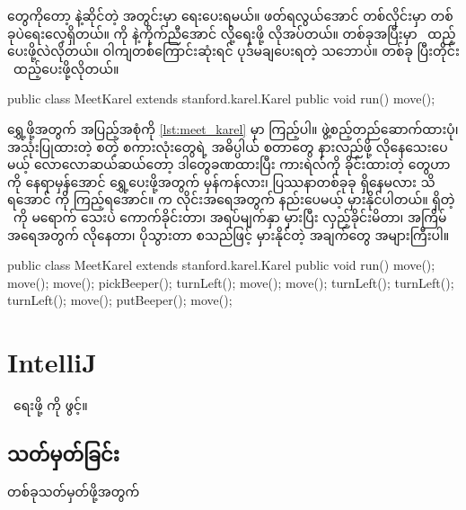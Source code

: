 \begin{sloppypar}
\mmcommand တွေကိုတော့  နဲ့ဆိုင်တဲ့ \mmcurlybrpair အတွင်းမှာ ရေးပေးရမယ်။ ဖတ်ရလွယ်အောင် တစ်လိုင်းမှာ တစ်ခုပဲရေးလေ့ရှိတယ်။  \mmcommand ကို \enJPL \mmsyntax နဲ့ကိုက်ညီအောင်  လို့ရေးဖို့ လိုအပ်တယ်။ \mmcommand တစ်ခုအပြီးမှာ \ensemicol\ ထည့်ပေးဖို့လဲလိုတယ်။ ဝါကျတစ်ကြောင်းဆုံးရင် ပုဒ်မချပေးရတဲ့ သဘောပဲ။ \mmcommand တစ်ခု ပြီးတိုင်း \mmsemicol\ ထည့်ပေးဖို့လိုတယ်။
\begin{lstcodeminimal}[]
public class MeetKarel extends stanford.karel.Karel { 
        public void run() {
                move();
        }        
}
\end{lstcodeminimal} 

\noindent \mmbeeper ရွှေ့ဖို့အတွက် \mmprogram အပြည့်အစုံကို \Lst \vref*{lst:meet_karel} မှာ ကြည့်ပါ။ \entemplate ဖွဲ့စည့်တည်ဆောက်ထားပုံ၊ အသုံးပြုထားတဲ့  စတဲ့ စကားလုံးတွေရဲ့ အဓိပ္ပါယ် စတာတွေ နားလည်ဖို့ လိုနေသေးပေမယ့် လောလောဆယ်ဆယ်တော့ ဒါတွေခဏထားပြီး ကားရဲလ်ကို ခိုင်းထားတဲ့ \mmcommand တွေဟာ \mmbeeper ကို နေရာမှန်အောင် ရွှေ့ပေးဖို့အတွက် မှန်ကန်လား၊ ပြဿနာတစ်ခုခု ရှိနေမလား သိရအောင် \mmprogram ကို \mmrun ကြည့်ရအောင်။ \mmprogram က လိုင်းအရေအတွက် နည်းပေမယ့် မှားနိုင်ပါတယ်။  \mmbeeper ရှိတဲ့ \mmcorner\ ကို မရောက် သေးပဲ ကောက်ခိုင်းတာ၊ အရပ်မျက်နှာ မှားပြီး လှည့်ခိုင်းမိတာ၊ အကြိမ်အရေအတွက် လိုနေတာ၊ ပိုသွားတာ စသည်ဖြင့် မှားနိုင်တဲ့ အချက်တွေ အများကြီးပါ။ 
\begin{lstcodesimple}[float, caption=ကားရဲလ် ပရိုဂရမ် template, label={lst:meet_karel}]
public class MeetKarel extends stanford.karel.Karel { 
        public void run() {
                move();
                move();
                move();
                pickBeeper();
                turnLeft();
                move();
                move();
                turnLeft();
                turnLeft();
                turnLeft();
                move();
                putBeeper();
                move();
        }        
}
\end{lstcodesimple}



\section{IntelliJ}
\mmprogram\ ‌ရေးဖို့ \enintellij \enIDE ကို ဖွင့်။


\subsection{ သတ်မှတ်ခြင်း}
 တစ်ခုသတ်မှတ်ဖို့အတွက် 


\end{sloppypar}
